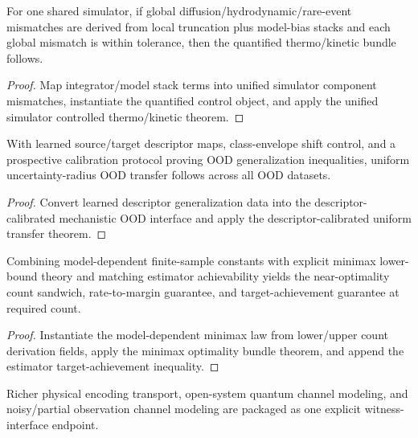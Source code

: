 \begin{theorem}\label{thm:integrator-error-stack-unified-thermo-kinetic}
For one shared simulator, if global diffusion/hydrodynamic/rare-event mismatches are derived from local truncation plus model-bias stacks and each global mismatch is within tolerance, then the quantified thermo/kinetic bundle follows.
\end{theorem}

\begin{proof}
Map integrator/model stack terms into unified simulator component mismatches, instantiate the quantified control object, and apply the unified simulator controlled thermo/kinetic theorem.
\end{proof}

\begin{theorem}\label{thm:learned-descriptor-ood-generalization-transfer}
With learned source/target descriptor maps, class-envelope shift control, and a prospective calibration protocol proving OOD generalization inequalities, uniform uncertainty-radius OOD transfer follows across all OOD datasets.
\end{theorem}

\begin{proof}
Convert learned descriptor generalization data into the descriptor-calibrated mechanistic OOD interface and apply the descriptor-calibrated uniform transfer theorem.
\end{proof}

\begin{theorem}\label{thm:estimator-minimax-derivation-bundle}
Combining model-dependent finite-sample constants with explicit minimax lower-bound theory and matching estimator achievability yields the near-optimality count sandwich, rate-to-margin guarantee, and target-achievement guarantee at required count.
\end{theorem}

\begin{proof}
Instantiate the model-dependent minimax law from lower/upper count derivation fields, apply the minimax optimality bundle theorem, and append the estimator target-achievement inequality.
\end{proof}

\begin{theorem}\label{thm:extended-physical-model-interface-scope-bundle}
Richer physical encoding transport, open-system quantum channel modeling, and noisy/partial observation channel modeling are packaged as one explicit witness-interface endpoint.
\end{theorem}

